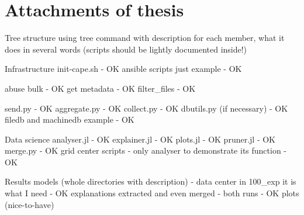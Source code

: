 \chapter{Attachments of thesis} \label{app:attach}
Tree structure using tree command with description for each member, what it does in several words (scripts should be lightly documented inside!)

Infrastructure
init-cape.sh - OK
ansible scripts just example - OK

abuse bulk - OK
get metadata - OK
filter_files - OK

send.py - OK
aggregate.py - OK
collect.py - OK
dbutils.py (if necessary) - OK
filedb and machinedb example - OK

Data science
analyser.jl - OK
explainer.jl - OK
plots.jl - OK
pruner.jl - OK
merge.py - OK
grid center scripts - only analyser to demonstrate its function - OK

Results
models (whole directories with description) - data center in 100_exp it is what I need - OK
explanations extracted and even merged - both runs - OK
plots (nice-to-have)

